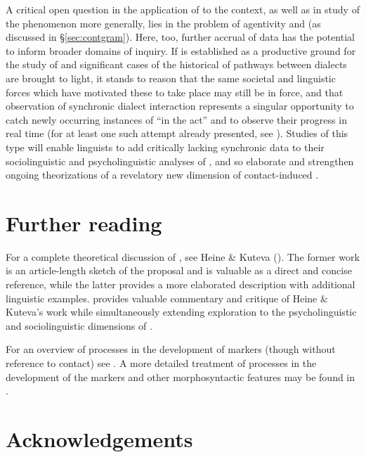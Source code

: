 \documentclass[output=paper]{langsci/langscibook}
\begin{document}
A critical open question in the application of  to the  context, as well as in study of the phenomenon more generally, lies in the problem of agentivity and  (as discussed in §\ref{sec:contgram}). Here, too, further accrual of  data has the potential to inform broader domains of inquiry. If  is established as a productive ground for the study of  and significant cases of the historical  of  pathways between dialects are brought to light, it stands to reason that the same societal and linguistic forces which have motivated these to take place may still be in force, and that observation of synchronic  dialect interaction represents a singular opportunity to catch newly occurring instances of  “in the act” and to observe their progress in real time (for at least one such attempt already presented, see \citealt{Abuamsha2016}). Studies of this type will enable linguists to add critically lacking synchronic data to their sociolinguistic and psycholinguistic analyses of , and so elaborate and strengthen ongoing theorizations of a revelatory new dimension of contact-induced .

\section*{Further reading}

For a complete theoretical discussion of , see Heine \& Kuteva (\citeyear{HeineKuteva2003,HeineKuteva2005}). The former work is an article-length sketch of the proposal and is valuable as a direct and concise reference, while the latter provides a more elaborated description with additional linguistic examples. \citet{Matras2009} provides valuable commentary and critique of Heine \& Kuteva’s work while simultaneously extending exploration to the psycholinguistic and sociolinguistic dimensions of . 

For an overview of  processes in the development of    markers (though without reference to contact) see \citet{Stewart1998}. A more detailed treatment of  processes in the development of the   markers and other morphosyntactic features may be found in \citet{Leddy-Cecere2018}.

\section*{Acknowledgements}
\end{document}
